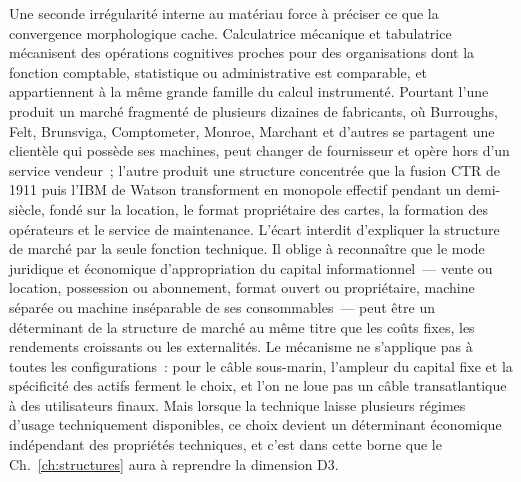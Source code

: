 Une seconde irrégularité interne au matériau force à préciser ce que la convergence morphologique cache. Calculatrice mécanique et tabulatrice mécanisent des opérations cognitives proches pour des organisations dont la fonction comptable, statistique ou administrative est comparable, et appartiennent à la même grande famille du calcul instrumenté. Pourtant l'une produit un marché fragmenté de plusieurs dizaines de fabricants, où Burroughs, Felt, Brunsviga, Comptometer, Monroe, Marchant et d'autres se partagent une clientèle qui possède ses machines, peut changer de fournisseur et opère hors d'un service vendeur~; l'autre produit une structure concentrée que la fusion CTR de 1911 puis l'IBM de Watson transforment en monopole effectif pendant un demi-siècle, fondé sur la location, le format propriétaire des cartes, la formation des opérateurs et le service de maintenance. L'écart interdit d'expliquer la structure de marché par la seule fonction technique. Il oblige à reconnaître que le mode juridique et économique d'appropriation du capital informationnel~--- vente ou location, possession ou abonnement, format ouvert ou propriétaire, machine séparée ou machine inséparable de ses consommables~--- peut être un déterminant de la structure de marché au même titre que les coûts fixes, les rendements croissants ou les externalités. Le mécanisme ne s'applique pas à toutes les configurations~: pour le câble sous-marin, l'ampleur du capital fixe et la spécificité des actifs ferment le choix, et l'on ne loue pas un câble transatlantique à des utilisateurs finaux. Mais lorsque la technique laisse plusieurs régimes d'usage techniquement disponibles, ce choix devient un déterminant économique indépendant des propriétés techniques, et c'est dans cette borne que le Ch.~\ref{ch:structures} aura à reprendre la dimension D3.

